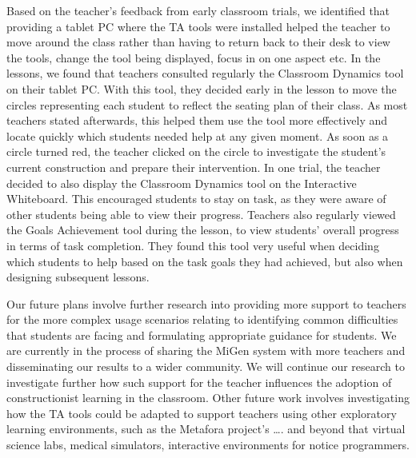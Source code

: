 Based on the teacher’s feedback from early classroom trials, we
identified that providing a tablet PC where the TA tools were
installed helped the teacher to move around the class rather than
having to return back to their desk to view the tools, change the tool
being displayed, focus in on one aspect etc. In the lessons, we found
that teachers consulted regularly the Classroom Dynamics tool on their
tablet PC. With this tool, they decided early in the lesson to move
the circles representing each student to reflect the seating plan of
their class. As most teachers stated afterwards, this helped them use
the tool more effectively and locate quickly which students needed
help at any given moment. As soon as a circle turned red, the teacher
clicked on the circle to investigate the student’s current
construction and prepare their intervention. In one trial, the teacher
decided to also display the Classroom Dynamics tool on the Interactive
Whiteboard. This encouraged students to stay on task, as they were
aware of other students being able to view their progress. Teachers
also regularly viewed the Goals Achievement tool during the lesson, to
view students’ overall progress in terms of task completion. They
found this tool very useful when deciding which students to help based
on the task goals they had achieved, but also when designing
subsequent lessons.

Our future plans involve further research into providing more support
to teachers for the more complex usage scenarios relating to
identifying common difficulties that students are facing and
formulating appropriate guidance for students. We are currently in the
process of sharing the MiGen system with more teachers and
disseminating our results to a wider community. We will continue our
research to investigate further how such support for the teacher
influences the adoption of constructionist learning in the
classroom. Other future work involves investigating how the TA tools
could be adapted to support teachers using other exploratory learning
environments, such as the Metafora project’s …. and beyond that
virtual science labs, medical simulators, interactive environments for
notice programmers.



